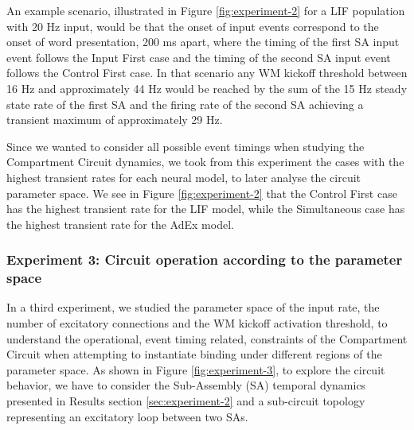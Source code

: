 \documentclass[10pt]{article}
\begin{document}
An example scenario, illustrated in Figure \ref{fig:experiment-2} for a LIF population with 20 Hz input, would be that the onset of input events correspond to the onset of word presentation, 200 ms apart, where the timing of the first SA input event follows the Input First case and the timing of the second SA input event follows the Control First case.
In that scenario any WM kickoff threshold between 16 Hz and approximately 44 Hz would be reached by the sum of the 15 Hz steady state rate of the first SA and the firing rate of the second SA achieving a transient maximum of approximately 29 Hz.

Since we wanted to consider all possible event timings when studying the Compartment Circuit dynamics, we took from this experiment the cases with the highest transient rates for each neural model, to later analyse the circuit parameter space.
We see in Figure \ref{fig:experiment-2} that the Control First case has the highest transient rate for the LIF model, while the Simultaneous case has the highest transient rate for the AdEx model.


\subsubsection{Experiment 3: Circuit operation according to the parameter space}

{\label{results:experiment-3}}

In a third experiment, we studied the parameter space of the input rate, the number of excitatory connections and the WM kickoff activation threshold, to understand the operational, event timing related, constraints of the Compartment Circuit when attempting to instantiate binding under different regions of the parameter space.
As shown in Figure \ref{fig:experiment-3}, to explore the circuit behavior, we have to consider the Sub-Assembly (SA) temporal dynamics presented in Results section \ref{sec:experiment-2} and a sub-circuit topology representing an excitatory loop between two SAs.
\end{document}
